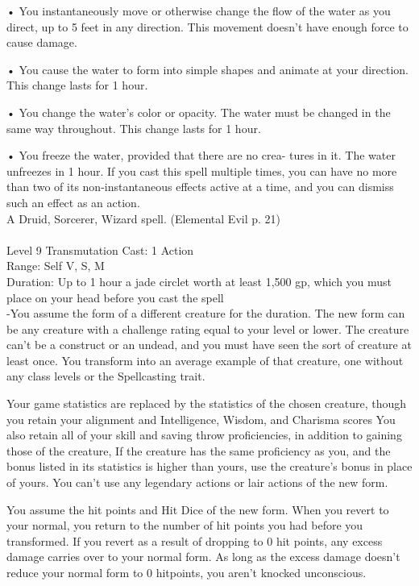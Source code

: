 \documentclass[10pt,twocolumn]{report}
\begin{document}
• You instantaneously move or otherwise change the flow of the water as you direct, up to 5 feet in any direction. This movement doesn’t have enough force to cause damage.

• You cause the water to form into simple shapes and animate at your direction. This change lasts for 1 hour.

• You change the water’s color or opacity. The water must be changed in the same way throughout. This change lasts for 1 hour.

• You freeze the water, provided that there are no crea- tures in it. The water unfreezes in 1 hour.
If you cast this spell multiple times, you can have no more than two of its non-instantaneous effects active at a time, and you can dismiss such an effect as an action.\\
A Druid, Sorcerer, Wizard spell. (Elemental Evil p. 21) \\


 \\
Level 9 \quad Transmutation \quad Cast: 1 Action\\
Range: Self \quad V, S, M\\
Duration: Up to 1 hour \quad a jade circlet worth at least 1,500 gp, which you must place on your head before you cast the spell\\
-You assume the form of a different creature for the duration.
The new form can be any creature with a challenge rating equal to your level or lower. The creature can’t be a construct or an undead, and you must have seen the sort of creature at least once. You transform into an average example of that creature, one without any class levels or the Spellcasting trait.

Your game statistics are replaced by the statistics of the chosen creature, though you retain your alignment and Intelligence, Wisdom, and Charisma scores You also retain all of your skill and saving throw proficiencies, in addition to gaining those of the creature, If the creature has the same proficiency as you, and the bonus listed in its statistics is higher than yours, use the creature’s bonus in place of yours. You can’t use any legendary actions or lair actions of the new form.

You assume the hit points and Hit Dice of the new form. When you revert to your normal, you return to the number of hit points you had before you transformed. If you revert as a result of dropping to 0 hit points, any excess damage carries over to your normal form. As long as the excess damage doesn’t reduce your normal form to 0 hitpoints, you aren’t knocked unconscious.
\end{document}
